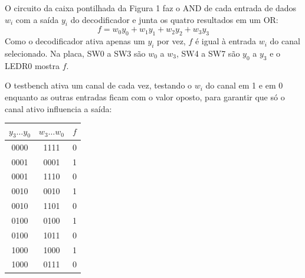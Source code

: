 \documentclass[report, 12pt]{uftreport}
\begin{document}
O circuito da caixa pontilhada da Figura 1 faz o AND de cada entrada de dados $w_i$ com a saída $y_i$ do decodificador e junta os quatro resultados em um OR:
\[
f = w_0 y_0 + w_1 y_1 + w_2 y_2 + w_3 y_3
\]
Como o decodificador ativa apenas um $y_i$ por vez, $f$ é igual à entrada $w_i$ do canal selecionado. Na placa, SW0 a SW3 são $w_0$ a $w_3$, SW4 a SW7 são $y_0$ a $y_3$ e o LEDR0 mostra $f$.



O testbench ativa um canal de cada vez, testando o $w_i$ do canal em 1 e em 0 enquanto as outras entradas ficam com o valor oposto, para garantir que só o canal ativo influencia a saída:

\begin{center}
\begin{tabular}{ccc}
\toprule
$y_3 \ldots y_0$ & $w_3 \ldots w_0$ & $f$ \\
\midrule
0000 & 1111 & 0 \\
0001 & 0001 & 1 \\
0001 & 1110 & 0 \\
0010 & 0010 & 1 \\
0010 & 1101 & 0 \\
0100 & 0100 & 1 \\
0100 & 1011 & 0 \\
1000 & 1000 & 1 \\
1000 & 0111 & 0 \\
\bottomrule
\end{tabular}
\end{center}
\end{document}
